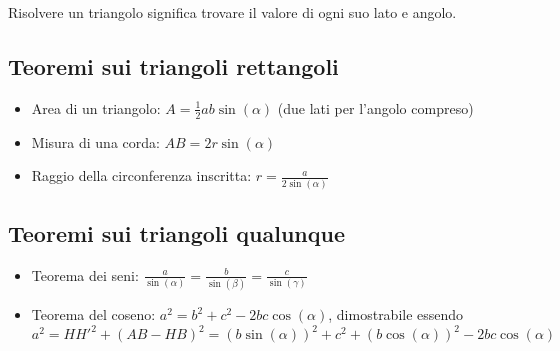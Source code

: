 Risolvere un triangolo significa trovare il valore di ogni suo lato e angolo.

\subsection{Teoremi sui triangoli rettangoli}

\begin{itemize}
    \item Area di un triangolo: $A = \frac{1}{2}ab\sin(\alpha)$ (due lati per l'angolo compreso) %
    \item Misura di una corda: $AB = 2r\sin(\alpha)$ %
    \item Raggio della circonferenza inscritta: $r = \frac{a}{2\sin(\alpha)}$
\end{itemize}

\subsection{Teoremi sui triangoli qualunque}

\begin{itemize}
    \item Teorema dei seni: $\frac{a}{\sin(\alpha)} = \frac{b}{\sin(\beta)} = \frac{c}{\sin(\gamma)}$ %
    \item Teorema del coseno: $a^2 = b^2 + c^2 - 2bc\cos(\alpha)$, dimostrabile essendo $a^2 = HH'^2 + (AB-HB)^2 = (b\sin(\alpha))^2 + c^2 + (b\cos(\alpha))^2 - 2bc\cos(\alpha)$
\end{itemize}